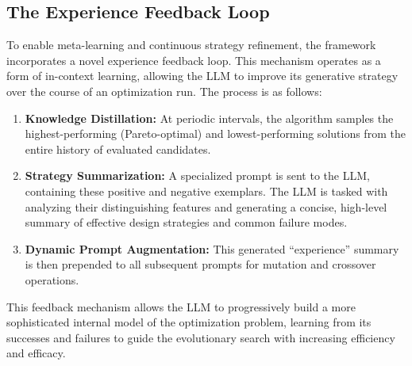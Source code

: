 \documentclass[preprint,12pt]{elsarticle}
\begin{document}
\subsection{The Experience Feedback Loop}
To enable meta-learning and continuous strategy refinement, the framework incorporates a novel experience feedback loop. This mechanism operates as a form of in-context learning, allowing the LLM to improve its generative strategy over the course of an optimization run. The process is as follows:
\begin{enumerate}
    \item \textbf{Knowledge Distillation:} At periodic intervals, the algorithm samples the highest-performing (Pareto-optimal) and lowest-performing solutions from the entire history of evaluated candidates.
    \item \textbf{Strategy Summarization:} A specialized prompt is sent to the LLM, containing these positive and negative exemplars. The LLM is tasked with analyzing their distinguishing features and generating a concise, high-level summary of effective design strategies and common failure modes.
    \item \textbf{Dynamic Prompt Augmentation:} This generated ``experience'' summary is then prepended to all subsequent prompts for mutation and crossover operations.
\end{enumerate}
This feedback mechanism allows the LLM to progressively build a more sophisticated internal model of the optimization problem, learning from its successes and failures to guide the evolutionary search with increasing efficiency and efficacy.




\clearpage


\end{document}
